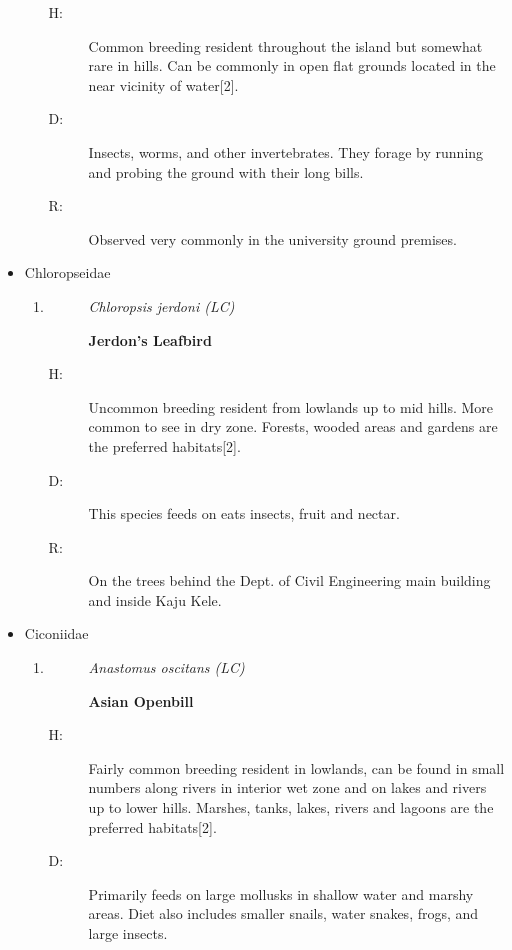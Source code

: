 \begin{itemize}
\begin{enumerate}
\begin{description}
\item[H: ]%
Common breeding resident throughout the island but somewhat rare in hills. Can be commonly in open flat grounds located in the near vicinity of water{[}2{]}.%
\item[D: ]%
Insects, worms, and other invertebrates. They forage by running and probing the ground with their long bills.%
\item[R: ]%
Observed very commonly in the university ground premises.%
\end{description}%
\end{enumerate}%
\item%
Chloropseidae%
\begin{enumerate}%
\item%
\begin{description}%
\item[]%
\textit{Chloropsis jerdoni (LC)}%
\item[]%
\textbf{Jerdon's Leafbird}%
\end{description}%
\begin{description}%
\item[H: ]%
Uncommon breeding resident from lowlands up to mid hills. More common to see in dry zone. Forests, wooded areas and gardens are the preferred habitats{[}2{]}.%
\item[D: ]%
This species feeds on eats insects, fruit and nectar. %
\item[R: ]%
On the trees behind the Dept. of Civil Engineering main building and inside Kaju Kele.%
\end{description}%
\end{enumerate}%
\item%
Ciconiidae%
\begin{enumerate}%
\item%
\begin{description}%
\item[]%
\textit{Anastomus oscitans (LC)}%
\item[]%
\textbf{Asian Openbill}%
\end{description}%
\begin{description}%
\item[H: ]%
Fairly common breeding resident in lowlands, can be found in small numbers along rivers in interior wet zone and on lakes and rivers up to lower hills. Marshes, tanks, lakes, rivers and lagoons are the preferred habitats{[}2{]}.%
\item[D: ]%
Primarily feeds on large mollusks in shallow water and marshy areas. Diet also includes smaller snails, water snakes, frogs, and large insects.%

\end{description}
\end{enumerate}
\end{itemize}
